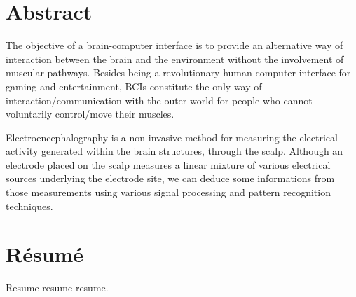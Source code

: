 \documentclass[12pt]{article}
\numberwithin{equation}{section}
\numberwithin{figure}{section}
\numberwithin{table}{section}
\begin{document}
\renewcommand\listfigurename{\normalsize\bfseries List of Figures}
\thispagestyle{empty}
\vspace*{0.15cm}
\listoffigures
\clearpage

\renewcommand\listtablename{\normalsize\bfseries List of Tables}
\thispagestyle{empty}
\vspace*{0.15cm}
\listoftables
\clearpage

\vspace*{-0.35cm}
\thispagestyle{empty}
\section*{Abstract}
\vspace*{6pt}

\par{
The objective of a brain-computer interface is to provide an alternative way of interaction between the brain and the environment
without the involvement of muscular pathways. Besides being a revolutionary human computer interface for gaming and entertainment,
BCIs constitute the only way of interaction/communication with the outer world for people who cannot voluntarily control/move their muscles.
}
\par {
Electroencephalography is a non-invasive method for measuring the electrical activity generated within the brain structures, through the scalp.
Although an electrode placed on the scalp measures a linear mixture of various electrical sources underlying the electrode site,
we can deduce some informations from those measurements using various signal processing and pattern recognition techniques.
}

\clearpage

\vspace*{-0.35cm}
\thispagestyle{empty}
\section*{R\'{e}sum\'{e}}
\vspace*{6pt}

\par{
Resume resume resume.
}
\clearpage
\end{document}
